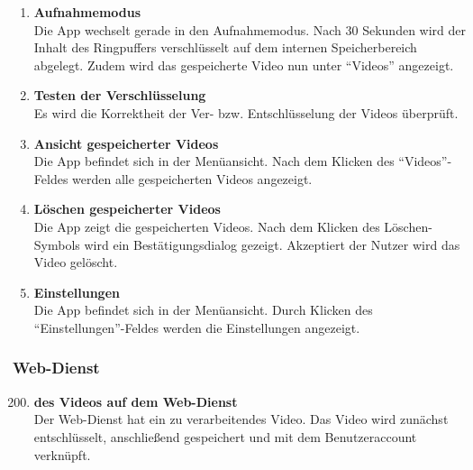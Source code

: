 \begin{enumerate}[\bfseries{TK}10]
\item \textbf{Aufnahmemodus} \hfill\\  
Die \gls{App} wechselt gerade in den Aufnahmemodus. Nach 30 Sekunden wird der Inhalt des Ringpuffers verschl\"usselt auf dem internen Speicherbereich abgelegt. Zudem wird das gespeicherte Video nun unter ``Videos'' angezeigt. 

\item \textbf{Testen der Verschl\"usselung} \hfill\\
Es wird die Korrektheit der Ver- bzw. Entschlüsselung der Videos überprüft.

\item \textbf{Ansicht gespeicherter Videos} \hfill\\
Die \gls{App} befindet sich in der Men\"uansicht. Nach dem Klicken des ``Videos''-Feldes werden alle gespeicherten Videos angezeigt.

\item \textbf{Löschen gespeicherter Videos} \hfill\\
Die \gls{App} zeigt die gespeicherten Videos. Nach dem Klicken des Löschen-Symbols wird ein Bestätigungsdialog gezeigt. Akzeptiert der Nutzer wird das Video gelöscht.

\item \textbf{Einstellungen} \hfill\\
Die \gls{App} befindet sich in der Men\"uansicht. Durch Klicken des ``Einstellungen''-Feldes werden die Einstellungen angezeigt.

\end{enumerate}

\subsubsection{\gls{Web-Dienst}}
\begin{enumerate}[\bfseries{TK}10]  
\setcounter{enumi}{199}{}
\item \textbf{ des Videos auf dem \gls{Web-Dienst}} \hfill\\  
Der Web-Dienst hat ein zu verarbeitendes Video. Das Video wird zunächst entschlüsselt,  anschließend gespeichert und mit dem Benutzeraccount verkn\"upft.

\end{enumerate}

